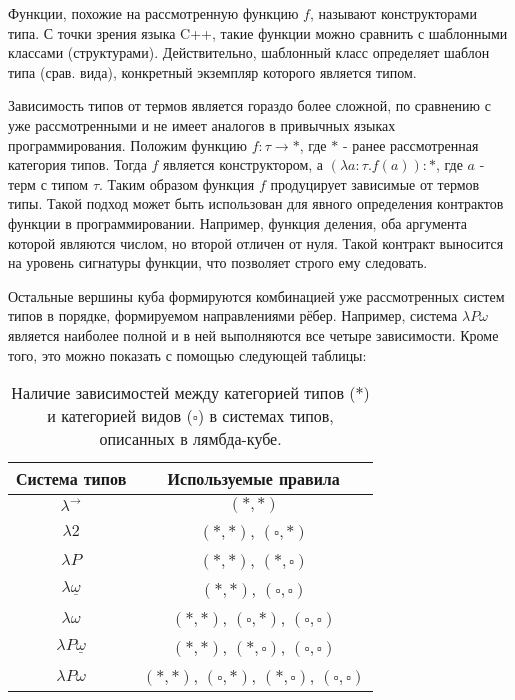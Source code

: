 Функции, похожие на рассмотренную функцию $f$, называют конструкторами типа.
С точки зрения языка C++, такие функции можно сравнить с шаблонными классами (структурами).
Действительно, шаблонный класс определяет шаблон типа (срав. вида), конкретный экземпляр которого является типом.

Зависимость типов от термов является гораздо более сложной, по сравнению с уже рассмотренными и не имеет аналогов в привычных языках программирования.
Положим функцию $f: \tau \to *$, где $*$ - ранее рассмотренная категория типов.
Тогда $f$ является конструктором, а $(\lambda a: \tau. f(a)) : *$, где $a$ - терм с типом $\tau$.
Таким образом функция $f$ продуцирует зависимые от термов типы.
Такой подход может быть использован для явного определения контрактов функции в программировании.
Например, функция деления, оба аргумента которой являются числом, но второй отличен от нуля.
Такой контракт выносится на уровень сигнатуры функции, что позволяет строго ему следовать.

Остальные вершины куба формируются комбинацией уже рассмотренных систем типов в порядке, формируемом направлениями рёбер.
Например, система $\lambda P \omega$ является наиболее полной и в ней выполняются все четыре зависимости.
Кроме того, это можно показать с помощью следующей таблицы:

\begin{table}[h]
    \centering
    \caption{Наличие зависимостей между категорией типов ($*$) и категорией видов ($\square$) в системах типов, описанных в лямбда-кубе.}
    \label{tab:}
    \begin{tabular}{|c|c|}
        \hline
        \textbf{Система типов}        & \textbf{Используемые правила}                                  \\\hline
        $\lambda^{\to}$               & $(*, *)$                                                       \\\hline
        $\lambda 2$                   & $(*, *)$, $(\square, *)$                                       \\\hline
        $\lambda P$                   & $(*, *)$, $(*, \square)$                                       \\\hline
        $\lambda \underline{\omega}$  & $(*, *)$, $(\square, \square)$                                 \\\hline
        $\lambda \omega$              & $(*, *)$, $(\square, *)$, $(\square, \square)$                 \\\hline
        $\lambda P\underline{\omega}$ & $(*, *)$, $(*, \square)$, $(\square, \square)$                 \\\hline
        $\lambda P\omega$             & $(*, *)$, $(\square, *)$, $(*, \square)$, $(\square, \square)$ \\
        \hline
    \end{tabular}
\end{table}


